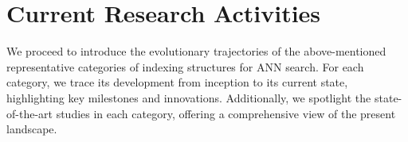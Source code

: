 \documentclass[11pt]{article}
\begin{document}




\section{Current Research Activities}
\label{bolong_sec:architecture}

We proceed to introduce the evolutionary trajectories of the above-mentioned representative categories of indexing structures for ANN search. For each category, we trace its development from inception to its current state, highlighting key milestones and innovations. Additionally, we spotlight the state-of-the-art studies in each category, offering a comprehensive view of the present landscape.
\end{document}
